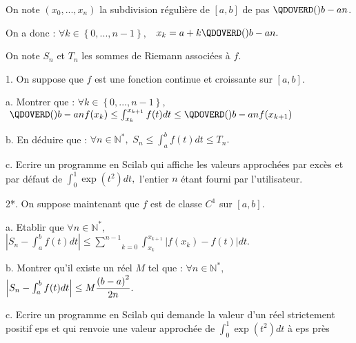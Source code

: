 \documentclass{article}
\begin{document}
On note $\left( x_{0},...,x_{n}\right) $ la subdivision r\'{e}guli\`{e}re de 
$\left[ a,b\right] $ de pas $\QDOVERD( ) {b-a}{n}$.

On a donc : $\forall k\in \left\{ 0,...,n-1\right\} ,$ \ $x_{k}={a+k}%
\QDOVERD( ) {b-a}{n}.$

On note $S_{n}$ et $T_{n}$ les sommes de Riemann associ\'{e}es \`{a} $f.$

1. On suppose que $f$ est une fonction continue et croissante sur $\left[ a,b%
\right] .$

a. Montrer que : $\forall k\in \left\{ 0,...,n-1\right\} ,$ $\ \QDOVERD( )
{b-a}{n}f(x_{k})\leq \int_{x_{k}}^{x_{k+1}}f(t)dt\leq \QDOVERD( )
{b-a}{n}f(x_{k+1})$

b. En d\'{e}duire que : $\forall n\in 
\mathbb{N}
^{\ast },$ $S_{n}\leq \int_{a}^{b}f(t)dt\leq T_{n}.$

c. Ecrire un programme en Scilab qui affiche les valeurs approch\'{e}es par
exc\`{e}s et par d\'{e}faut de $\int_{0}^{1}\exp (t^{2})dt,$ l'entier $n$ 
\'{e}tant fourni par l'utilisateur.

2*. On suppose maintenant que $f$ est de classe $C^{1}$ sur $\left[ a,b%
\right] .$

a. Etablir que $\forall n\in 
\mathbb{N}
^{\ast },$ $\left\vert S_{n}-\int_{a}^{b}f(t)dt\right\vert \leq \underset{k=0%
}{\overset{n-1}{\sum }}\int_{x_{k}}^{x_{k+1}}\left\vert
f(x_{k})-f(t)\right\vert dt.$

b. Montrer qu'il existe un r\'{e}el $M$ tel que : $\forall n\in 
\mathbb{N}
^{\ast },$ $\left\vert S_{n}-\int_{a}^{b}f(t)dt\right\vert \leq M\dfrac{%
\left( b-a\right) ^{2}}{2n}.$

c. Ecrire un programme en Scilab qui demande la valeur d'un r\'{e}el
strictement positif eps et qui renvoie une valeur approch\'{e}e de $%
\int_{0}^{1}\exp (t^{2})dt$ \`{a} eps pr\`{e}s
\end{document}
